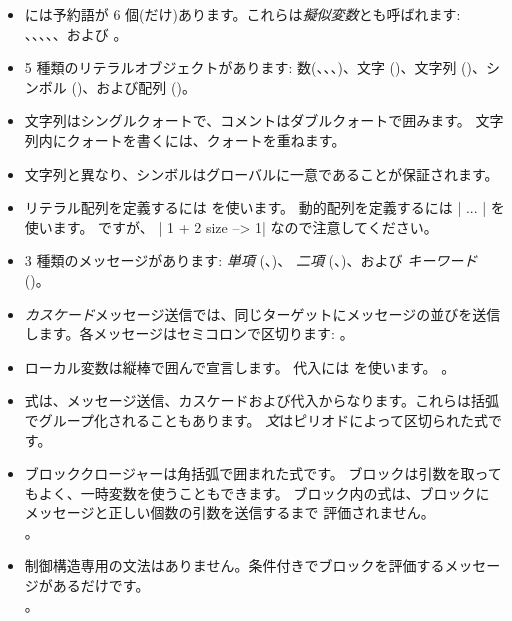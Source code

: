 \documentclass[a4paper,10pt,twoside]{book}
\begin{document}
\begin{itemize}

\item	\pharo には予約語が 6 個(だけ)あります。これらは\textit{擬似変数}とも呼ばれます: 、、、、、および 。

\item	5 種類のリテラルオブジェクトがあります: 数(、、、)、文字 ()、文字列 ()、シンボル ()、および配列 ()。

\item	文字列はシングルクォートで、コメントはダブルクォートで囲みます。
		文字列内にクォートを書くには、クォートを重ねます。

\item	文字列と異なり、シンボルはグローバルに一意であることが保証されます。

\item	リテラル配列を定義するには  を使います。
		動的配列を定義するには \ct|{ ... }| を使います。
		 ですが、
		\ct|{ 1 + 2 } size --> 1|
		なので注意してください。

\item	3 種類のメッセージがあります:
		\emph{単項} (\eg {}、)、
		\emph{二項} (\eg {}、)、および
		\emph{キーワード} (\eg {})。

\item	\emph{カスケード}メッセージ送信では、同じターゲットにメッセージの並びを送信します。各メッセージはセミコロンで区切ります:
。

\item	ローカル変数は縦棒で囲んで宣言します。
		代入には \ct{:=} を使います。
		。

\item	式は、メッセージ送信、カスケードおよび代入からなります。これらは括弧でグループ化されることもあります。
		\emph{文}はピリオドによって区切られた式です。

\item	ブロッククロージャーは角括弧で囲まれた式です。
		ブロックは引数を取ってもよく、一時変数を使うこともできます。
		ブロック内の式は、ブロックに  メッセージと正しい個数の引数を送信するまで
		評価されません。\\
		。

\item	制御構造専用の文法はありません。条件付きでブロックを評価するメッセージがあるだけです。\\
 		。

\end{itemize}

\ifx\wholebook\relax\else
\end{document}
